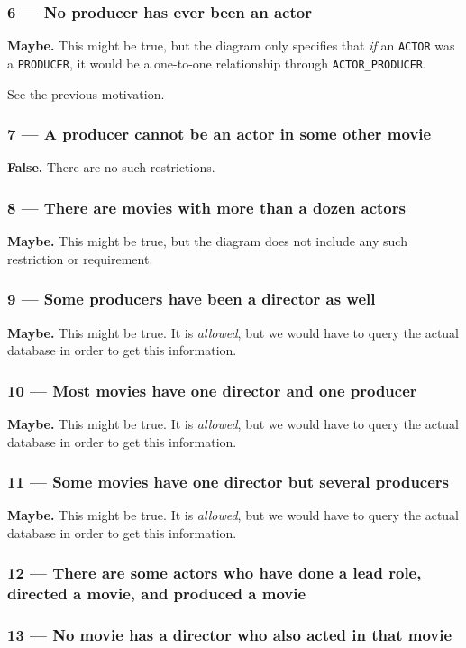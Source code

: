 \subsubsection{6 --- No producer has ever been an actor}
\textbf{Maybe.} This might be true, but the diagram only specifies that
\emph{if} an \texttt{ACTOR} was a \texttt{PRODUCER}, it would be a one-to-one
relationship through \texttt{ACTOR\_PRODUCER}.

See the previous motivation. 

\subsubsection{7 --- A producer cannot be an actor in some other movie}
\textbf{False.} There are no such restrictions.

\subsubsection{8 --- There are movies with more than a dozen actors}
\textbf{Maybe.} This might be true, but the diagram does not include
any such restriction or requirement.

\subsubsection{9 --- Some producers have been a director as well}
\textbf{Maybe.} This might be true. It is \emph{allowed}, but we would have
to query the actual database in order to get this information.

\subsubsection{10 --- Most movies have one director and one producer}
\textbf{Maybe.} This might be true. It is \emph{allowed}, but we would have
to query the actual database in order to get this information.

\subsubsection{11 --- Some movies have one director but several producers}
\textbf{Maybe.} This might be true. It is \emph{allowed}, but we would have
to query the actual database in order to get this information.

\subsubsection{12 --- There are some actors who have done a lead role, directed a movie, and produced a movie}

\subsubsection{13 --- No movie has a director who also acted in that movie}

